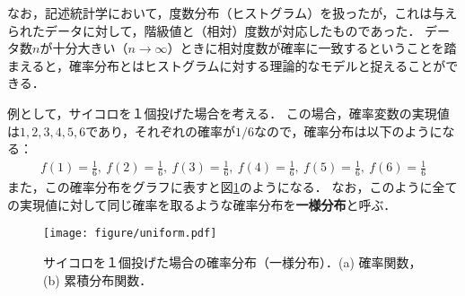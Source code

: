 %

%
なお，記述統計学において，度数分布（ヒストグラム）を扱ったが，これは与えられたデータに対して，階級値と（相対）度数が対応したものであった．
%
データ数$ n $が十分大きい（$ n\to \infty $）ときに相対度数が確率に一致するということを踏まえると，確率分布とはヒストグラムに対する理論的なモデルと捉えることができる．
%

%
例として，サイコロを１個投げた場合を考える．
%
この場合，確率変数の実現値は$ 1,2,3,4,5,6 $であり，それぞれの確率が$ 1/6 $なので，確率分布は以下のようになる：
%
\begin{align*}
	f(1) = \frac{1}{6},\ f(2) = \frac{1}{6},\ f(3) = \frac{1}{6},\ f(4) = \frac{1}{6},\ f(5) = \frac{1}{6},\ f(6) = \frac{1}{6}
\end{align*}
%
また，この確率分布をグラフに表すと図\ref{fig:uniform}のようになる．
%
なお，このように全ての実現値に対して同じ確率を取るような確率分布を\textbf{一様分布}と呼ぶ．
%

%
\begin{figure}[H]
	\centering
	\texttt{[image: figure/uniform.pdf]}
	\caption{サイコロを１個投げた場合の確率分布（一様分布）．(a) 確率関数，(b) 累積分布関数．}
	\label{fig:uniform}
\end{figure}
%

